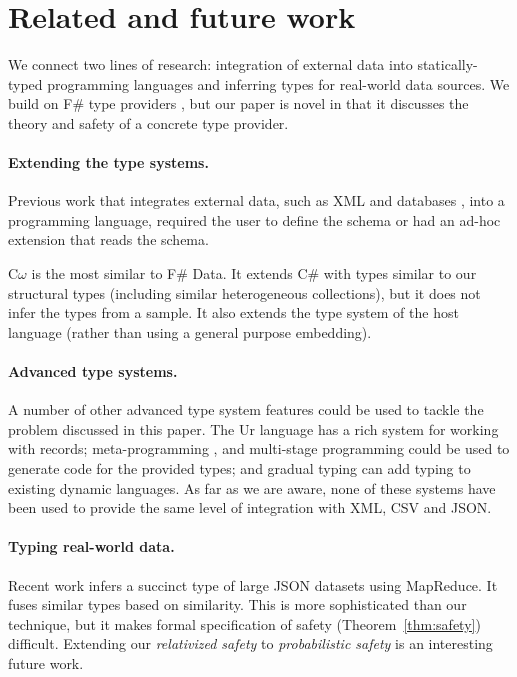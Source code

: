 \documentclass[10pt,preprint,blind,clearpagebib]{sigplanconf}
\begin{document}
\section{Related and future work}
\label{sec:related}

We connect two lines of research: integration of external data into statically-typed 
programming languages and inferring types for real-world data sources. We build on F\# type 
providers \cite{fsharp-typeprov,fsharp-typeprov-ddfp,idris-tp,liteq}, but our paper is novel 
in that it discusses the theory and safety of a concrete type provider. 

\paragraph{Extending the type systems.} 
Previous work that integrates external data, such as XML \cite{xduce,xduce-ml} and databases 
\cite{links,linq}, into a programming language, required the user to define the schema
or had an ad-hoc extension that reads the schema.

C$\omega$ \cite{comega-xs} is the most similar to F\# Data. It extends C\# with types similar to our
structural types (including similar heterogeneous collections), but it does not infer the types
from a sample. It also extends the type system of the host language (rather than using a general purpose
embedding).

\paragraph{Advanced type systems.}
A number of other advanced type system features could be used to tackle the problem discussed 
in this paper. The Ur \cite{ur} language has a rich system for working with records; 
meta-programming \cite{template-hask}, \cite{th-camlp4} and multi-stage programming \cite{multi-stage}
could be used to generate code for the provided types; and gradual typing \cite{gradual,gradual-js} 
can add typing to existing dynamic languages. As far as we are aware, none of these 
systems have been used to provide the same level of integration with XML, CSV and JSON.

\paragraph{Typing real-world data.}
Recent work \cite{typing-json} infers a succinct type of large JSON datasets using MapReduce.
It fuses similar types based on similarity. This is more sophisticated than our technique, but it 
makes formal specification of safety (Theorem~\ref{thm:safety}) difficult. Extending our 
\emph{relativized safety} to \emph{probabilistic safety} is an interesting future work.
\end{document}
